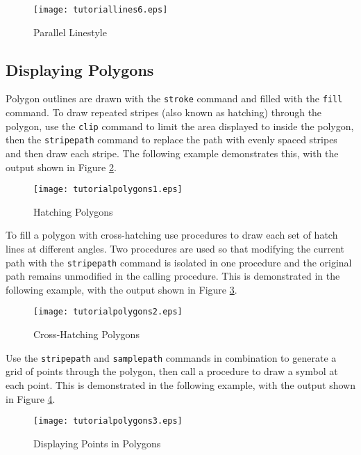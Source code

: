 

\begin{figure}[htb]
\texttt{[image: tutoriallines6.eps]}
\caption{Parallel Linestyle}
\label{tutoriallines6}
\end{figure}

\subsection{Displaying Polygons}

Polygon outlines are drawn with the \texttt{stroke}
command and filled with the \texttt{fill} command.
To draw repeated stripes (also known as hatching) through
the polygon, use the \texttt{clip}
command to limit the area displayed to inside the polygon,
then the \texttt{stripepath}
command to replace the path with evenly spaced stripes and
then draw each stripe.  The following example demonstrates this,
with the output shown in Figure \ref{tutorialpolygons1}.



\begin{figure}[htb]
\texttt{[image: tutorialpolygons1.eps]}
\caption{Hatching Polygons}
\label{tutorialpolygons1}
\end{figure}

To fill a polygon with cross-hatching use procedures to
draw each set of hatch lines at different angles.  Two procedures
are used so that modifying the current path with the
\texttt{stripepath}
command is isolated in one procedure and the original path
remains unmodified in the calling procedure.
This is demonstrated in the following example, with the output
shown in Figure \ref{tutorialpolygons2}.



\begin{figure}[htb]
\texttt{[image: tutorialpolygons2.eps]}
\caption{Cross-Hatching Polygons}
\label{tutorialpolygons2}
\end{figure}

Use the \texttt{stripepath} and \texttt{samplepath}
commands in combination to generate a grid of points through the
polygon, then call a procedure to draw a symbol at each point.
This is demonstrated in the following example, with the output
shown in Figure \ref{tutorialpolygons3}.



\begin{figure}[htb]
\texttt{[image: tutorialpolygons3.eps]}
\caption{Displaying Points in Polygons}
\label{tutorialpolygons3}
\end{figure}

